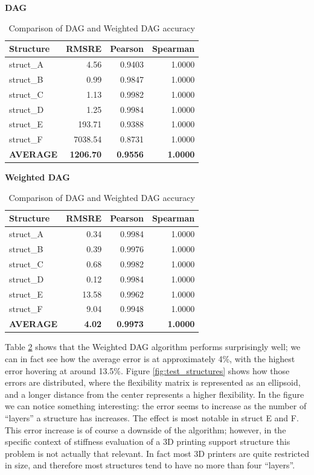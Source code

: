 \begin{table}[htbp]
  \centering
  \caption{Comparison of DAG and Weighted DAG accuracy}
  \label{tab:dag_performance}

  \textbf{DAG}\\[0.5em]
  \begin{tabular}{lrrr}
    \toprule
    Structure & RMSRE & Pearson & Spearman \\
    \midrule
    struct\_A & 4.56 & 0.9403 & 1.0000 \\
    struct\_B & 0.99 & 0.9847 & 1.0000 \\
    struct\_C & 1.13 & 0.9982 & 1.0000 \\
    struct\_D & 1.25 & 0.9984 & 1.0000 \\
    struct\_E & 193.71 & 0.9388 & 1.0000 \\
    struct\_F & 7038.54 & 0.8731 & 1.0000 \\
    \midrule
    \textbf{AVERAGE} & \textbf{1206.70} & \textbf{0.9556} & \textbf{1.0000} \\
    \bottomrule
  \end{tabular}

  \vspace{1.5em}

  \textbf{Weighted DAG}\\[0.5em]
  \begin{tabular}{lrrr}
    \toprule
    Structure & RMSRE & Pearson & Spearman \\
    \midrule
    struct\_A & 0.34 & 0.9984 & 1.0000 \\
    struct\_B & 0.39 & 0.9976 & 1.0000 \\
    struct\_C & 0.68 & 0.9982 & 1.0000 \\
    struct\_D & 0.12 & 0.9984 & 1.0000 \\
    struct\_E & 13.58 & 0.9962 & 1.0000 \\
    struct\_F & 9.04 & 0.9948 & 1.0000 \\
    \midrule
    \textbf{AVERAGE} & \textbf{4.02} & \textbf{0.9973} & \textbf{1.0000} \\
    \bottomrule
  \end{tabular}
\end{table}


Table \ref{tab:dag_performance} shows that the Weighted DAG algorithm performs surprisingly well; we can in fact 
see how the average error is at approximately 4\%, with the highest error hovering at around 13.5\%.
Figure \ref{fig:test_structures} shows how those errors are distributed, where the flexibility matrix
is represented as an ellipsoid, and a longer distance from the center represents a higher flexibility.
In the figure we can notice something interesting: the error seems to increase as the number of ``layers''
a structure has increases. The effect is most notable in struct E and F.
This error increase is of course a downside of the algorithm; however,
in the specific context of stiffness evaluation of a 3D printing support structure this problem
is not actually that relevant. In fact most 3D printers are quite restricted in size, and
therefore most structures tend to have no more than four ``layers''.


